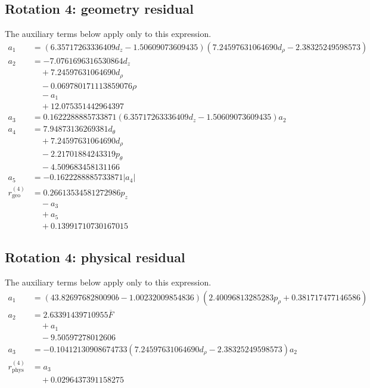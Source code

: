 \subsection*{Rotation 4: geometry residual}
The auxiliary terms below apply only to this expression.
\begin{align*}
a_{1} &= \left(6.35717263336409 d_z - 1.50609073609435\right) \left(7.24597631064690 d_\rho - 2.38325249598573\right) \\
a_{2} &= - 7.0761696316530864 d_z \\
&\quad + 7.24597631064690 d_\rho \\
&\quad - 0.069780171113859076 \rho \\
&\quad - a_{1} \\
&\quad + 12.075351442964397 \\
a_{3} &= 0.1622288885733871 \left(6.35717263336409 d_z - 1.50609073609435\right) a_{2} \\
a_{4} &= 7.94873136269381 d_\theta \\
&\quad + 7.24597631064690 d_\rho \\
&\quad - 2.21701884243319 p_\theta \\
&\quad - 4.509683458131166 \\
a_{5} &= - 0.1622288885733871 \left|{a_{4}}\right| \\
r_{\mathrm{geo}}^{(4)} &= 0.26613534581272986 p_z \\
&\quad - a_{3} \\
&\quad + a_{5} \\
&\quad + 0.13991710730167015
\end{align*}

\subsection*{Rotation 4: physical residual}
The auxiliary terms below apply only to this expression.
\begin{align*}
a_{1} &= \left(43.8269768280090 b - 1.00232009854836\right) \left(2.40096813285283 p_\rho + 0.381717477146586\right) \\
a_{2} &= 2.63391439710955 \overline{F} \\
&\quad + a_{1} \\
&\quad - 9.50597278012606 \\
a_{3} &= - 0.10412130908674733 \left(7.24597631064690 d_\rho - 2.38325249598573\right) a_{2} \\
r_{\mathrm{phys}}^{(4)} &= a_{3} \\
&\quad + 0.0296437391158275
\end{align*}

